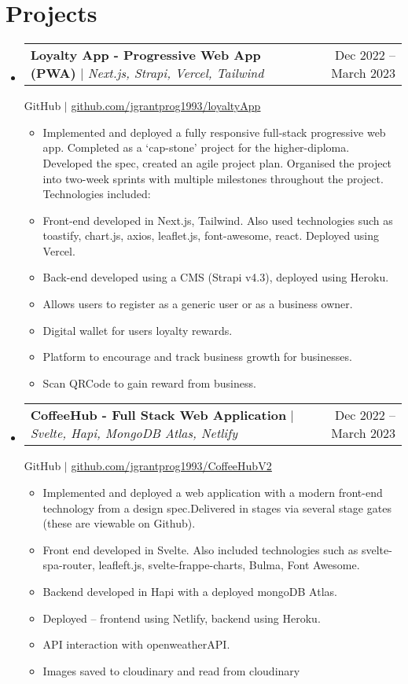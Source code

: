 \documentclass[letterpaper,11pt]{article}
\makeatletter
\newcommand{\resumeItem}[1]{
  \item\small{
    {#1 \vspace{-2pt}}
  }
}
\newcommand{\resumeProjectHeading}[2]{
    \item
    \begin{tabular*}{0.97\textwidth}{l@{\extracolsep{\fill}}r}
      \small#1 & #2 \\
    \end{tabular*}\vspace{-7pt}
}
\newcommand{\resumeSubHeadingListStart}{\begin{itemize}[leftmargin=0.15in, label={}]}
\newcommand{\resumeSubHeadingListEnd}{\end{itemize}}
\newcommand{\resumeItemListStart}{\begin{itemize}}
\newcommand{\resumeItemListEnd}{\end{itemize}\vspace{-5pt}}
\makeatother
\begin{document}
\section{Projects}
    \resumeSubHeadingListStart
      \resumeProjectHeading
          {\textbf{Loyalty App - Progressive Web App (PWA)} $|$ \emph{Next.js, Strapi, Vercel, Tailwind}}{Dec 2022 -- March 2023}
          \begin{center}
                \small GitHub $|$ \href{https://github.com/jgrantprog1993/project_loyaltyApp}{\underline{github.com/jgrantprog1993/loyaltyApp}} 
            \end{center}
            
          \resumeItemListStart
            \resumeItem{Implemented and deployed a fully responsive full-stack progressive web app. Completed as a ‘cap-stone’ project for the higher-diploma. Developed the spec, created an agile                   project plan. Organised the project into two-week sprints with multiple milestones throughout the project. Technologies included:}
            \resumeItem{Front-end developed in Next.js, Tailwind. Also used technologies such as toastify, chart.js, axios, leaflet.js, font-awesome, react. Deployed using Vercel.}
            \resumeItem{Back-end developed using a CMS (Strapi v4.3), deployed using Heroku.}
            \resumeItem{Allows users to register as a generic user or as a business owner.}
            \resumeItem{Digital wallet for users loyalty rewards.}
            \resumeItem{Platform to encourage and track business growth for businesses.}
            \resumeItem{Scan QRCode to gain reward from business.}
          
          \resumeItemListEnd
          
      \resumeProjectHeading
          {\textbf{CoffeeHub - Full Stack Web Application} $|$ \emph{Svelte, Hapi, MongoDB Atlas, Netlify}}{Dec 2022 -- March 2023}
          \begin{center}
                \small GitHub $|$ \href{https://github.com/jgrantprog1993/CoffeeHubV2_FrontEnd}{\underline{github.com/jgrantprog1993/CoffeeHubV2}} 
            \end{center}
          \resumeItemListStart
            \resumeItem{Implemented and deployed a web application with a modern front-end technology from a design spec.Delivered in stages via several stage gates (these are viewable on Github).}
            \resumeItem{Front end developed in Svelte. Also included technologies such as svelte-spa-router, leafleft.js, svelte-frappe-charts, Bulma, Font Awesome.}
            \resumeItem{Backend developed in Hapi with a deployed mongoDB Atlas.}
            \resumeItem{Deployed – frontend using Netlify, backend using Heroku.}
            \resumeItem{API interaction with openweatherAPI.}
            \resumeItem{Images saved to cloudinary and read from cloudinary}
          \resumeItemListEnd
    \resumeSubHeadingListEnd
\end{document}
